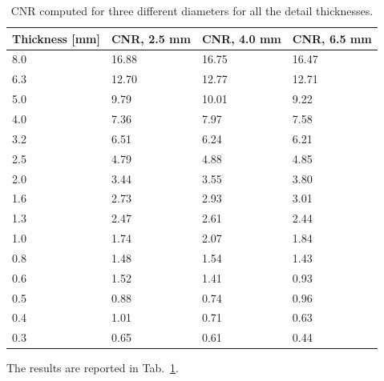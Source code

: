 \documentclass[a4paper]{article}
\begin{document}
\begin{table}[h]
	\centering
	\begin{tabular}{| l | l | l | l |}
		\hline
    Thickness [mm] & CNR, 2.5 mm & CNR, 4.0 mm & CNR, 6.5 mm\\ \hline
    8.0 & 16.88 & 16.75 & 16.47\\ \hline
    6.3 & 12.70 & 12.77 & 12.71\\ \hline
    5.0 & 9.79 & 10.01 & 9.22\\ \hline
    4.0 & 7.36 & 7.97 & 7.58\\ \hline
    3.2 & 6.51 & 6.24 & 6.21\\ \hline
    2.5 & 4.79 & 4.88 & 4.85\\ \hline
    2.0 & 3.44 & 3.55 & 3.80\\ \hline
    1.6 & 2.73 & 2.93 & 3.01\\ \hline
    1.3 & 2.47 & 2.61 & 2.44\\ \hline
    1.0 & 1.74 & 2.07 & 1.84\\ \hline
    0.8 & 1.48 & 1.54 & 1.43\\ \hline
    0.6 & 1.52 & 1.41 & 0.93\\ \hline
    0.5 & 0.88 & 0.74 & 0.96\\ \hline
    0.4 & 1.01 & 0.71 & 0.63\\ \hline
    0.3 & 0.65 & 0.61 & 0.44\\ \hline
	\end{tabular}
  \caption{CNR computed for three different diameters for all the detail thicknesses.}
  \label{tab:ex4}
\end{table}

The results are reported in Tab.~\ref{tab:ex4}.
\end{document}
